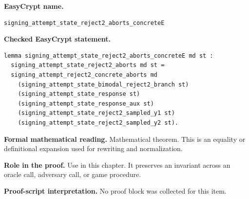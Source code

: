 \begin{formaltheorem}
\noindent\textbf{EasyCrypt name.}
\begin{lstlisting}[language=EasyCrypt,basicstyle=\ttfamily\scriptsize]
signing_attempt_state_reject2_aborts_concreteE
\end{lstlisting}
\noindent\textbf{Checked EasyCrypt statement.}
\begin{lstlisting}[language=EasyCrypt,basicstyle=\ttfamily\scriptsize]
lemma signing_attempt_state_reject2_aborts_concreteE md st :
  signing_attempt_state_reject2_aborts md st =
  signing_attempt_reject2_concrete_aborts md
    (signing_attempt_state_bimodal_reject2_branch st)
    (signing_attempt_state_response st)
    (signing_attempt_state_response_aux st)
    (signing_attempt_state_reject2_sampled_y1 st)
    (signing_attempt_state_reject2_sampled_y2 st).
\end{lstlisting}
\noindent\textbf{Formal mathematical reading.}
Mathematical theorem. This is an equality or definitional expansion used for rewriting and normalization.

\noindent\textbf{Role in the proof.}
Use in this chapter. It preserves an invariant across an oracle call, adversary call, or game procedure.

\noindent\textbf{Proof-script interpretation.}
No proof block was collected for this item.

\end{formaltheorem}

